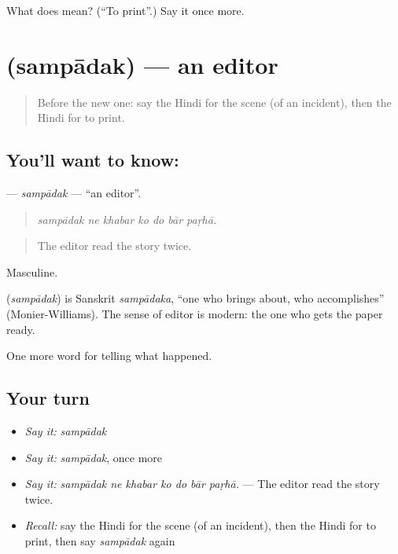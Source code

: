 \begin{tcolorbox}[breakable,colback=teal!4,colframe=teal!35!black,title={Before you move on}]
What does  mean? (\textquotedblleft{}To print\textquotedblright{}.) Say it once more.
\end{tcolorbox}
\section[\texorpdfstring{\hi{संपादक} (sampādak)}{संपादक (sampādak)}]{ (sampādak) — an editor}

\label{lesson:HI-C313-sampadak}



\begin{quote}
Before the new one: say the Hindi for the scene (of an incident), then the Hindi for to print.
\end{quote}

\subsection*{You'll want to know: }
\textbf{} — \emph{sampādak} — \textquotedblleft{}an editor\textquotedblright{}.

\begin{quote}
      
\end{quote}

\begin{quote}
\emph{sampādak ne khabar ko do bār paṛhā.}
\end{quote}

\begin{quote}
The editor read the story twice.
\end{quote}

Masculine.

\begin{cousinweb}
\textbf{} (\emph{sampādak}) is Sanskrit \emph{sampādaka}, \textquotedblleft{}one who brings about, who accomplishes\textquotedblright{} (Monier-Williams). The sense of editor is modern: the one who gets the paper ready.
\end{cousinweb}

\begin{grammarlens}[title={What you've built}]
One more word for telling what happened.
\end{grammarlens}

\subsection*{Your turn}
\begin{itemize}
\raggedright
  \item \emph{Say it:} \emph{sampādak}
  \item \emph{Say it:} \emph{sampādak}, once more
  \item \emph{Say it:} \emph{sampādak ne khabar ko do bār paṛhā.} — The editor read the story twice.
  \item \emph{Recall:} say the Hindi for the scene (of an incident), then the Hindi for to print, then say \emph{sampādak} again
\end{itemize}

